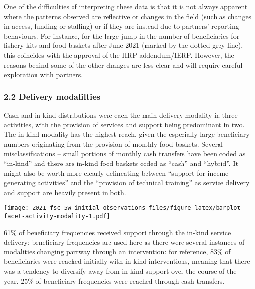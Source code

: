 \documentclass[
]{article}
\begin{document}
One of the difficulties of interpreting these data is that it is not
always apparent where the patterns observed are reflective or changes in
the field (such as changes in access, funding or staffing) or if they
are instead due to partners' reporting behaviours. For instance, for the
large jump in the number of beneficiaries for fishery kits and food
baskets after June 2021 (marked by the dotted grey line), this coincides
with the approval of the HRP addendum/IERP. However, the reasons behind
some of the other changes are less clear and will require careful
exploration with partners.

\hypertarget{delivery-modalilties}{%
\subsubsection{2.2 Delivery modalilties}\label{delivery-modalilties}}

Cash and in-kind distributions were each the main delivery modality in
three activities, with the provision of services and support being
predominant in two. The in-kind modality has the highest reach, given
the especially large beneficiary numbers originating from the provision
of monthly food baskets. Several misclassifications -- small portions of
monthly cash transfers have been coded as ``in-kind'' and there are
in-kind food baskets coded as ``cash'' and ``hybrid''. It might also be
worth more clearly delineating between ``support for income-generating
activities'' and the ``provision of technical training'' as service
delivery and support are heavily present in both.

\texttt{[image: 2021\_fsc\_5w\_initial\_observations\_files/figure-latex/barplot-facet-activity-modality-1.pdf]}

61\% of beneficiary frequencies received support through the in-kind
service delivery; beneficiary frequencies are used here as there were
several instances of modalities changing partway through an
intervention: for reference, 83\% of beneficiaries were reached
initially with in-kind interventions, meaning that there was a tendency
to diversify away from in-kind support over the course of the year. 25\%
of beneficiary frequencies were reached through cash transfers.
\end{document}
